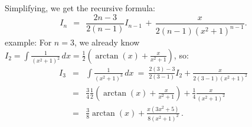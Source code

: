 \documentclass[11pt]{article}
\begin{document}
Simplifying, we get the recursive formula:
$$
I_n \ \ =\ \ \frac{2n{-}3}{2(n{-}1)}I_{n-1} \,+\, \frac{x}{2(n{-}1)(x^2 + 1)^{n-1}}.
$$
{\sc example:} For $n=3$, we already know $I_2 = \int\!\frac{1}{(x^2 + 1)^2}\,dx
= \frac12(\arctan(x) +\frac{x}{x^2+1})$, so:
$$\begin{array}{rcl}
I_3 &=& \int\!\frac{1}{(x^2 + 1)^3}\,dx 
\ =\  \frac{2(3)-3}{2(3-1)}I_{2} + \frac{x}{2(3-1)(x^2 + 1)^{2}}
\\[.8em]
&=&
  \frac34 \frac12(\arctan(x) +\frac{x}{x^2+1})+ \frac14\frac{x}{(x^2 + 1)^{2}}
\\[.8em]
&=&
  \frac38\arctan(x) +\frac{x (3 x^2 + 5)}{8 (x^2 + 1)^2}\,.
\end{array}$$
\end{document}
